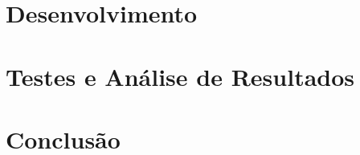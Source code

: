 \documentclass[
	12pt,				%
	openright,			%
	twoside,			%
	a4paper,			%
	english,			%
	french,				%
	spanish,			%
	brazil				%
	]{abntex2}
\begin{document}
\chapter{Desenvolvimento}
\chapter{Testes e Análise de Resultados}
\chapter{Conclusão}
\postextual


%
%



\partapendices


\printindex
\end{document}
